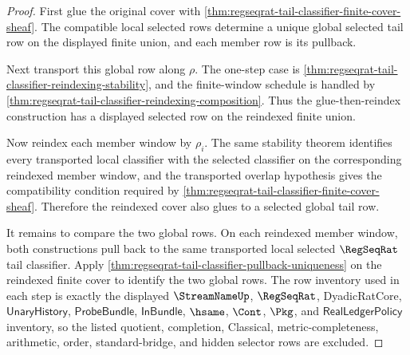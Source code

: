 \begin{proof}
First glue the original cover with
\autoref{thm:regseqrat-tail-classifier-finite-cover-sheaf}. The compatible
local selected rows determine a unique global selected tail row on the
displayed finite union, and each member row is its pullback.

Next transport this global row along $\rho$. The one-step case is
\autoref{thm:regseqrat-tail-classifier-reindexing-stability}, and the
finite-window schedule is handled by
\autoref{thm:regseqrat-tail-classifier-reindexing-composition}. Thus the
glue-then-reindex construction has a displayed selected row on the reindexed
finite union.

Now reindex each member window by $\rho_i$. The same stability theorem
identifies every transported local classifier with the selected classifier on
the corresponding reindexed member window, and the transported overlap
hypothesis gives the compatibility condition required by
\autoref{thm:regseqrat-tail-classifier-finite-cover-sheaf}. Therefore the
reindexed cover also glues to a selected global tail row.

It remains to compare the two global rows. On each reindexed member window,
both constructions pull back to the same transported local selected
$\RegSeqRat$ tail classifier. Apply
\autoref{thm:regseqrat-tail-classifier-pullback-uniqueness} on the reindexed
finite cover to identify the two global rows. The row inventory used in each
step is exactly the displayed $\StreamNameUp$, $\RegSeqRat$, DyadicRatCore,
$\mathsf{UnaryHistory}$, $\mathsf{ProbeBundle}$, $\mathsf{InBundle}$,
$\hsame$, $\Cont$, $\Pkg$, and $\mathsf{RealLedgerPolicy}$ inventory, so the
listed quotient, completion, Classical, metric-completeness, arithmetic,
order, standard-bridge, and hidden selector rows are excluded.
\end{proof}

